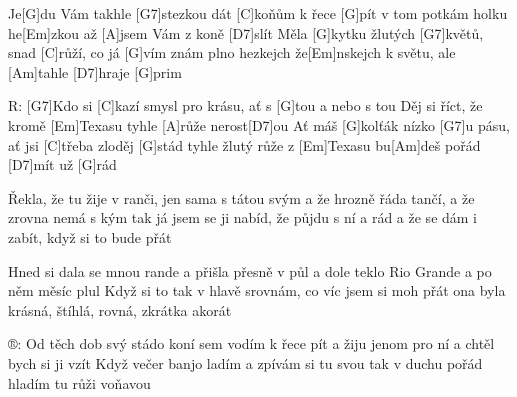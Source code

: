 
Je[G]du Vám takhle [G7]stezkou dát [C]koňům k řece [G]pít
v tom potkám holku he[Em]zkou až [A]jsem Vám z koně [D7]slít
Měla [G]kytku žlutých [G7]květů, snad [C]růží, co já [G]vím
znám plno hezkejch že[Em]nskejch k světu, ale [Am]tahle [D7]hraje [G]prim

R: [G7]Kdo si [C]kazí smysl pro krásu, ať s [G]tou a nebo s tou
Děj si říct, že kromě [Em]Texasu tyhle [A]růže nerost[D7]ou
Ať máš [G]kolťák nízko [G7]u pásu, ať jsi [C]třeba zloděj [G]stád
tyhle žlutý růže z [Em]Texasu bu[Am]deš pořád [D7]mít už [G]rád


Řekla, že tu žije v ranči, jen sama s tátou svým
a že hrozně řáda tančí, a že zrovna nemá s kým
tak já jsem se ji nabíd, že půjdu s ní a rád
a že se dám i zabít, když si to bude přát

Hned si dala se mnou rande a přišla přesně v půl
a dole teklo Rio Grande a po něm měsíc plul
Když si to tak v hlavě srovnám, co víc jsem si moh přát
ona byla krásná, štíhlá, rovná, zkrátka akorát

®:
Od těch dob svý stádo koní sem vodím k řece pít
a žiju jenom pro ní a chtěl bych si ji vzít
Když večer banjo ladím a zpívám si tu svou
tak v duchu pořád hladím tu růži voňavou

